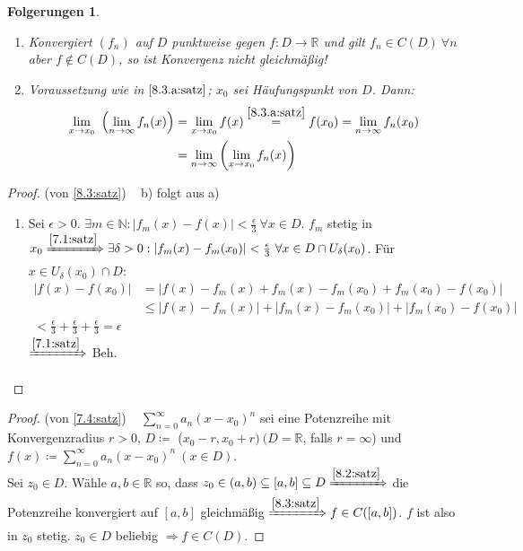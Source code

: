 \documentclass[14pt,titlepage,ngerman,a4paper,headsepline,DIV15,halfparskip*]{scrartcl}
\newcommand{\N}{\mathbb{N}}
\newcommand{\R}{\mathbb{R}}
\theoremstyle{named}
\theoremstyle{dotless}
\newtheorem*{folgerungen}{Folgerungen}
\begin{document}
\begin{folgerungen} ~\
	\begin{enumerate}
		\item Konvergiert $(f_{n})$ auf $D$ punktweise gegen $f \colon D \rightarrow \R$ und gilt $f_{n} \in C(D) ~\forall n$ aber $f \notin C(D)$, so ist Konvergenz nicht gleichmä{\ss}ig!
		\item Voraussetzung wie in $\ref{8.3.a:satz}$; $x_{0}$ sei Häufungspunkt von $D$. Dann:
			\begin{align*}
				\lim_{x \rightarrow x_{0}} \left( \lim_{n \rightarrow \infty} f_{n}(x) \right) & = \lim_{x \rightarrow x_{0}} f(x) \overset{\ref{8.3.a:satz}}{=} f(x_{0}) = \lim_{n \rightarrow \infty} f_{n}(x_{0}) \\
					& = \lim_{n \rightarrow \infty} \left( \lim_{x \rightarrow x_{0}} f_{n}(x) \right)  
			\end{align*}
	\end{enumerate}	
\end{folgerungen}

\begin{proof}(von \ref{8.3:satz}) ~ b) folgt aus a)
	\begin{enumerate}
		\item Sei $\epsilon > 0$. $\exists m \in \N: |f_{m}(x) - f(x)| < \frac{\epsilon}{3} ~\forall x \in D$. $f_{m}$ stetig in $x_{0} \xRightarrow[]{\ref{7.1:satz}} \exists \delta > 0 : |f_{m}(x) - f_{m}(x_{0})| < \frac{\epsilon}{3} ~\forall x \in D \cap U_{\delta}(x_{0})$. Für $x \in U_{\delta}(x_{0}) \cap D$:
			\begin{align*}
				|f(x) - f(x_{0})| & = |f(x) - f_{m}(x) + f_{m}(x) - f_{m}(x_{0}) + f_{m}(x_{0}) - f(x_{0})| \\ 
					& \leq |f(x) - f_{m}(x) | + | f_{m}(x) - f_{m}(x_{0})| + | f_{m}(x_{0}) - f(x_{0})| \\
					< \frac{\epsilon}{3} +  \frac{\epsilon}{3} + \frac{\epsilon}{3} = \epsilon
			\end{align*}
			$\xRightarrow[]{\ref{7.1:satz}}$ Beh.
	\end{enumerate}
\end{proof}


\begin{proof}(von \ref{7.4:satz}) ~ $\sum_{n=0}^{\infty}a_{n}(x - x_{0})^{n}$ sei eine Potenzreihe mit Konvergenzradius $r > 0$, $D \coloneqq$ ($x_{0} - r, x_{0} + r) ~(D = \R$, falls $r = \infty$) und $f(x) \coloneqq \sum_{n=0}^{\infty} a_{n}(x-x_{0})^{n} ~(x \in D)$. \\ %
	Sei $z_{0} \in D$. Wähle $a, b \in \R$ so, dass $z_{0} \in (a, b) \subseteq [a, b] \subseteq D \xRightarrow[]{\ref{8.2:satz}}$ die Potenzreihe konvergiert auf $[a, b]$ gleichmä{\ss}ig $\xRightarrow[]{\ref{8.3:satz}} f \in C([a, b])$. $f$ ist also in $z_{0}$ stetig. $z_{0} \in D$ beliebig $\Rightarrow f \in C(D)$.
\end{proof}
\end{document}
